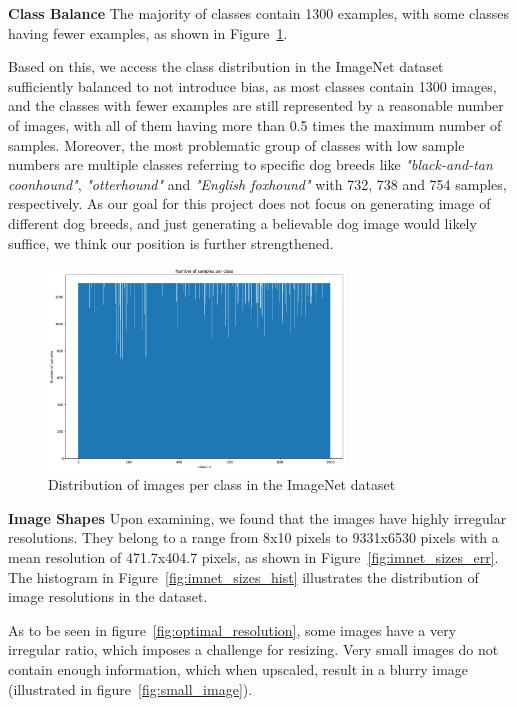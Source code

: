 \textbf{Class Balance}
The majority of classes contain 1300 examples, with some classes having fewer examples, as shown in
Figure~\ref{fig:imnet_dist}.

Based on this, we access the class distribution in the ImageNet dataset sufficiently balanced to not introduce bias, as
most classes contain 1300 images, and the classes with fewer examples are still represented by a reasonable number
of images, with all of them having more than 0.5 times the maximum number of samples.
Moreover, the most problematic group of classes with low sample numbers are multiple classes referring to specific dog breeds
like \textit{"black-and-tan coonhound"}, \textit{"otterhound"} and \textit{"English foxhound"} with 732,
738 and 754 samples, respectively.
As our goal for this project does not focus on generating image of different dog breeds, and just generating a
believable dog image would likely suffice, we think our position is further strengthened.

\begin{figure}[h]
    \centering
    \includegraphics[width=0.7\textwidth]{../../sample_images/imagenet_dist}
    \caption{Distribution of images per class in the ImageNet dataset}
    \label{fig:imnet_dist}
\end{figure}

\textbf{Image Shapes}
Upon examining, we found that the images have highly irregular resolutions.
They belong to a range from 8x10 pixels to 9331x6530 pixels with a mean resolution of 471.7x404.7 pixels, as shown in
Figure~\ref{fig:imnet_sizes_err}.
The histogram in Figure~\ref{fig:imnet_sizes_hist} illustrates the distribution of image resolutions in the dataset.

As to be seen in figure~\ref{fig:optimal_resolution}, some images have a very irregular ratio, which imposes a challenge
for resizing.
Very small images do not contain enough information, which when upscaled, result in a blurry image (illustrated in
figure~\ref{fig:small_image}).

